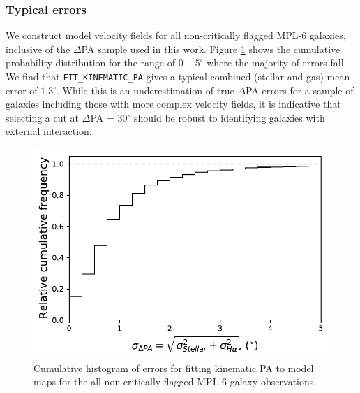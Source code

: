 \subsubsection{Typical errors}
We construct model velocity fields for all non-critically flagged MPL-6 galaxies, inclusive of the $\Delta$PA sample used in this work. Figure \ref{fig:model_errors} shows the cumulative probability distribution for the range of $0-5^{\circ}$ where the majority of errors fall. We find that \texttt{FIT\_KINEMATIC\_PA} gives a typical combined (stellar and gas) mean error of $1.3^{\circ}$. While this is an underestimation of true $\Delta$PA errors for a sample of galaxies including those with more complex velocity fields, it is indicative that selecting a cut at $\Delta$PA = 30$^{\circ}$ should be robust to identifying galaxies with external interaction. 

\begin{figure}
	\includegraphics[width=\linewidth]{thesis/latex/kin_mis_files/cumulative_model_errors.pdf}
    \caption{Cumulative histogram of errors for fitting kinematic PA to model maps for the all non-critically flagged MPL-6 galaxy observations.}
    \label{fig:model_errors}
\end{figure}